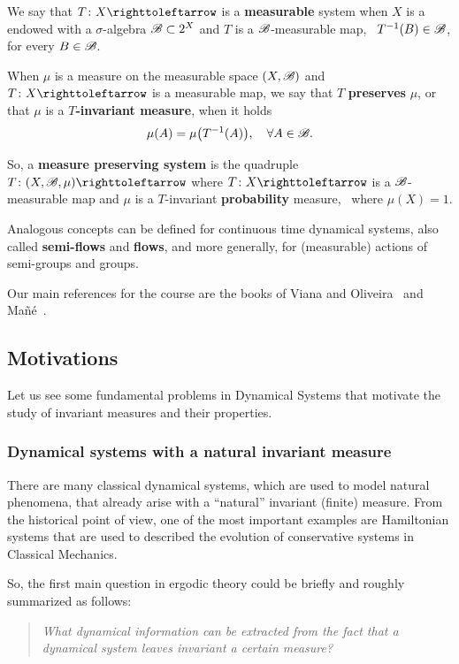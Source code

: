We say that $T\colon X\carr$ is a \textbf{measurable} system when $X$ is a endowed with a $\sigma$-algebra $\mathscr{B}\subset 2^{X}$ and $T$ is a $\mathscr{B}$-measurable map, \ie~$T^{-1}(B)\in\mathscr{B}$, for every $B\in\mathscr{B}$.

When $\mu$ is a measure on the measurable space $(X,\mathscr{B})$ and $T\colon X\carr$ is a measurable map, we say that $T$ \textbf{preserves} $\mu$, or that $\mu$ is a \textbf{$T$-invariant measure}, when it holds
\begin{displaymath}
  \mu(A)=\mu\big(T^{-1}(A)\big),\quad\forall A\in\mathscr{B}.
\end{displaymath}

So, a \textbf{measure preserving system} is the quadruple $T\colon (X,\B,\mu)\carr$ where $T\colon X\carr$ is a $\mathscr{B}$-measurable map and $\mu$ is a $T$-invariant \textbf{probability} measure, \ie~where $\mu(X)=1$.

Analogous concepts can be defined for continuous time dynamical systems, also called \textbf{semi-flows} and \textbf{flows}, and more generally, for (measurable) actions of semi-groups and groups.

Our main references for the course are the books of Viana and Oliveira~\cite{VianaOliveiraFoundErgTh} and Mañé~\cite{ManeBook}.

\subsection{Motivations}\label{sec:motivations} Let us see some fundamental problems in Dynamical Systems that motivate the study of invariant measures and their properties.

\subsubsection{Dynamical systems with a natural invariant measure}\label{sec:dynam-syst-natur-inv-meas}

There are many classical dynamical systems, which are used to model natural phenomena, that already arise with a ``natural'' invariant (finite) measure. From the historical point of view, one of the most important examples are Hamiltonian systems that are used to described the evolution of conservative systems in Classical Mechanics.

So, the first main question in ergodic theory could be briefly and roughly summarized as follows:
\begin{quote}
  \emph{What dynamical information can be extracted from the fact that a dynamical system leaves invariant a certain measure?}
\end{quote}


